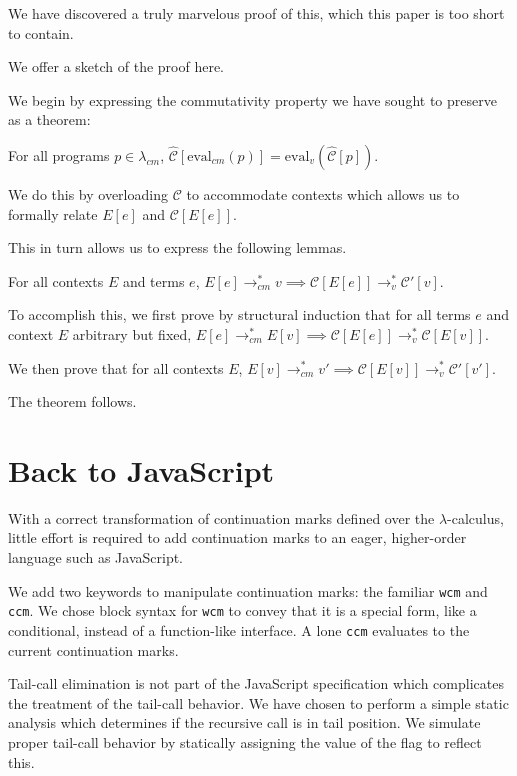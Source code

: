 \documentclass{llncs}
\newcommand{\lc}[0]{$\lambda$-calculus}
\newcommand{\lvrrs}[0]{\rightarrow_v^{*}}
\newcommand{\cmrrs}[0]{\rightarrow_{cm}^{*}}
\newcommand{\C}[1]{\mathcal{C}[#1]}
\newcommand{\Cp}[1]{\mathcal{C}'[#1]}
\newcommand{\Ch}[1]{\hat{\mathcal{C}}[#1]}
\begin{document}
We have discovered a truly marvelous proof of this, which this paper is too short to contain.

We offer a sketch of the proof here.

We begin by expressing the commutativity property we have sought to preserve as a theorem:

\begin{theorem}
For all programs $p\in\lambda_{cm}$, $\Ch{\mathrm{eval}_{cm}(p)}=\mathrm{eval}_{v}(\Ch{p})$.
\end{theorem}

We do this by overloading $\mathcal{C}$ to accommodate contexts which allows us to formally relate $E[e]$ and $\C{E[e]}$.

This in turn allows us to express the following lemmas.

\begin{lemma}
For all contexts $E$ and terms $e$, $E[e]\cmrrs v\implies\C{E[e]}\lvrrs\Cp{v}$.
\end{lemma}

To accomplish this, we first prove by structural induction that for all terms $e$ and context $E$ arbitrary but fixed, $E[e]\cmrrs E[v]\implies\C{E[e]}\lvrrs\C{E[v]}$. 

We then prove that for all contexts $E$, $E[v]\cmrrs v'\implies\C{E[v]}\lvrrs\Cp{v'}$.

The theorem follows.

\section{Back to JavaScript}
\label{sec-javascript}

With a correct transformation of continuation marks defined over the \lc, little effort is required to add continuation marks to an eager, higher-order language such as JavaScript.

We add two keywords to manipulate continuation marks: the familiar \texttt{wcm} and \texttt{ccm}. We chose block syntax for \texttt{wcm} to convey that it is a special form, like a conditional, instead of a function-like interface. A lone \texttt{ccm} evaluates to the current continuation marks.

Tail-call elimination is not part of the JavaScript specification which complicates the treatment of the tail-call behavior. We have chosen to perform a simple static analysis which determines if the recursive call is in tail position. We simulate proper tail-call behavior by statically assigning the value of the flag to reflect this.
\end{document}
